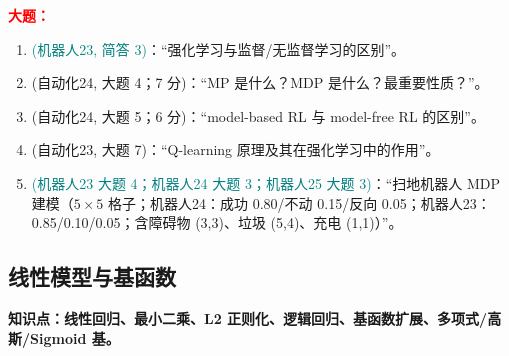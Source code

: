﻿\documentclass[../main.tex]{subfiles}
\begin{document}
\noindent\textbf{\textcolor{red}{大题：}}
\begin{enumerate}[itemsep=0.3em, topsep=0.2em, leftmargin=1.5em]
    \item \textcolor{teal}{(机器人23, 简答 3)}：``强化学习与监督/无监督学习的区别''。 
    \item \textcolor{autoclassgreen}{(自动化24, 大题 4；7 分)}：``MP 是什么？MDP 是什么？最重要性质？''。 
    \item \textcolor{autoclassgreen}{(自动化24, 大题 5；6 分)}：``model-based RL 与 model-free RL 的区别''。 
    \item \textcolor{autoclassgreen}{(自动化23, 大题 7)}：``Q-learning 原理及其在强化学习中的作用''。 
    \item \textcolor{teal}{(机器人23 大题 4；机器人24 大题 3；机器人25 大题 3)}：``扫地机器人 MDP 建模（$5\times5$ 格子；机器人24：成功 0.80/不动 0.15/反向 0.05；机器人23：0.85/0.10/0.05；含障碍物 (3,3)、垃圾 (5,4)、充电 (1,1)）''。 
\end{enumerate}

\subsection{线性模型与基函数}

\noindent\textbf{知识点：线性回归、最小二乘、L2 正则化、逻辑回归、基函数扩展、多项式/高斯/Sigmoid 基。}
\end{document}

